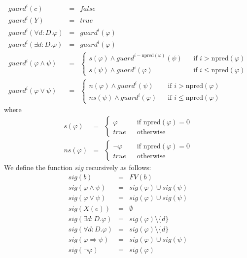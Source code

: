\documentclass{article}
\begin{document}
\begin{equation*}
\begin{array}{lll}
guard^{i}(c) & = & false \\ 
guard^{i}(Y) & = & true \\ 
guard^{i}(\forall d:D.\varphi ) & = & guard^{i}(\varphi ) \\ 
guard^{i}(\exists d:D.\varphi ) & = & guard^{i}(\varphi ) \\ 
guard^{i}(\varphi \wedge \psi ) & = & \left\{ 
\begin{array}{lll}
s(\varphi )\wedge guard^{i-\mathrm{npred}(\varphi )}(\psi ) &  & \text{if }i>%
\mathrm{npred}(\varphi ) \\ 
s(\psi )\wedge guard^{i}(\varphi ) &  & \text{if }i\leq \mathrm{npred}%
(\varphi )%
\end{array}%
\right. \\ 
guard^{i}(\varphi \vee \psi ) & = & \left\{ 
\begin{array}{lll}
n(\varphi )\wedge guard^{i}(\psi ) &  & \text{if }i>\mathrm{npred}(\varphi )
\\ 
ns(\psi )\wedge guard^{i}(\varphi ) &  & \text{if }i\leq \mathrm{npred}%
(\varphi )%
\end{array}%
\right.%
\end{array}%
\end{equation*}%
where%
\begin{equation*}
\begin{array}{lll}
s(\varphi ) & = & \left\{ 
\begin{array}{lll}
\varphi &  & \text{if }\mathrm{npred}(\varphi )=0 \\ 
true &  & \text{otherwise}%
\end{array}%
\right. \\ 
ns(\varphi ) & = & \left\{ 
\begin{array}{lll}
\lnot \varphi &  & \text{if }\mathrm{npred}(\varphi )=0 \\ 
true &  & \text{otherwise}%
\end{array}%
\right.%
\end{array}%
\end{equation*}%
We define the function $sig$ recursively as follows:%
\begin{equation*}
\begin{array}{lll}
sig(b) & = & FV(b) \\ 
sig(\varphi \wedge \psi ) & = & sig(\varphi )\cup sig(\psi ) \\ 
sig(\varphi \vee \psi ) & = & sig(\varphi )\cup sig(\psi ) \\ 
sig(X(e)) & = & \emptyset \\ 
sig(\exists d:D.\varphi ) & = & sig(\varphi )\setminus \{d\} \\ 
sig(\forall d:D.\varphi ) & = & sig(\varphi )\setminus \{d\} \\ 
sig(\varphi \Rightarrow \psi ) & = & sig(\varphi )\cup sig(\psi ) \\ 
sig(\lnot \varphi ) & = & sig(\varphi )%
\end{array}%
\end{equation*}
\end{document}
